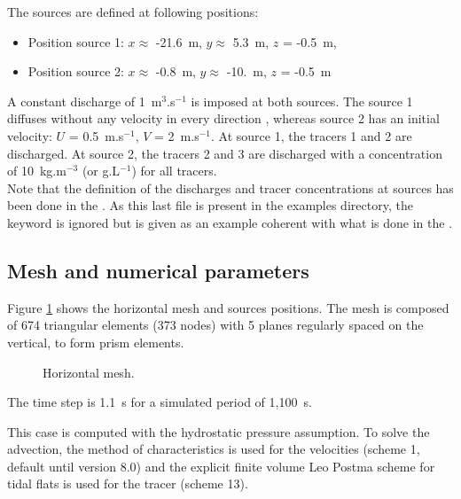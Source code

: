 \bigskip
The sources are defined at following positions:
\begin{itemize}
\item Position source 1: $x \approx$ -21.6~m, $y \approx$ 5.3~m, $z$ = -0.5~m,
\item Position source 2: $x \approx$ -0.8~m, $y \approx$ -10.~m, $z$ = -0.5~m
\end{itemize}
A constant discharge of 1~m$^3$.s$^{-1}$ is imposed at both sources.
The source 1 diffuses without any velocity in every direction , 
whereas source 2 has an initial velocity: 
$U$ = 0.5~m.s$^{-1}$, $V$ = 2~m.s$^{-1}$.
At source 1, the tracers 1 and 2 are discharged. At source 2, 
the tracers 2 and 3 are discharged with a concentration 
of 10~kg.m$^{-3}$ (or g.L$^{-1}$) for all tracers.\\
Note that the definition of the discharges and tracer concentrations at sources
has been done in the .
As this last file is present in the examples directory, the keyword
 is ignored but is given
as an example coherent with what is done in the .

\subsection{Mesh and numerical parameters}

\bigskip
Figure \ref{t3d:source:fig:meshH} shows the horizontal mesh and sources
positions. The mesh is composed of 674 triangular elements (373 nodes) with 5 planes  
regularly spaced on the vertical, to form prism elements.\\

\begin{figure}[!htbp]
 \centering
 \caption{Horizontal mesh.}
 \label{t3d:source:fig:meshH}
\end{figure}

The time step is 1.1~s for a simulated period of 1,100~s.

\bigskip
This case is computed with the hydrostatic pressure assumption. 
To solve the advection, the method of characteristics 
is used for the velocities (scheme 1, default until version 8.0)
and the explicit finite volume 
Leo Postma scheme for tidal flats is used for the tracer (scheme 13).


